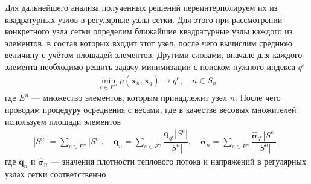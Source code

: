 Для дальнейшего анализа полученных решений переинтерполируем их из квадратурных узлов в регулярные узлы сетки. Для этого при рассмотрении конкретного узла сетки определим ближайшие квадратурные узлы каждого из элементов, в состав которых входит этот узел, после чего вычислим среднюю величину с учётом площадей элементов. Другими словами, вначале для каждого элемента необходимо решить задачу минимизации с поиском нужного индекса $q^e$
\begin{gather*}
	\min_{e \in E^n} \rho(\boldsymbol{x}_n, \boldsymbol{x}_q) \rightarrow q^e,
	\quad
	n \in S_h
\end{gather*}
где $E^n$ --- множество элементов, которым принадлежит узел $n$. После чего проводим процедуру осреднения с весами, где в качестве весовых множителей используем площади элементов
\begin{gather*}
	|S^n| = \sum\limits_{e \in E^n} |S^e|,
	\quad
	\boldsymbol{q}_n = \sum\limits_{e \in E^n} \dfrac{\boldsymbol{q}_{q^e} |S^e|}{|S^n|},
	\quad
	\widehat{\boldsymbol{\sigma}}_n = \sum\limits_{e \in E^n} \dfrac{\widehat{\boldsymbol{\sigma}}_{q^e} |S^e|}{|S^n|},
\end{gather*}
где $\boldsymbol{q}_n$ и $\widehat{\boldsymbol{\sigma}}_n$ --- значения плотности теплового потока и напряжений в регулярных узлах сетки соответственно.